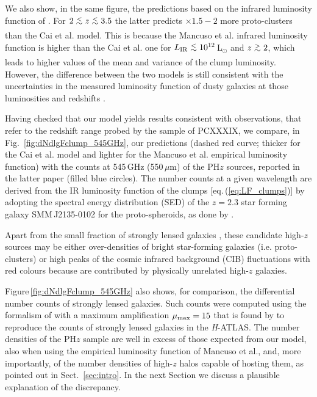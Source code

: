 \documentclass[useAMS,usenatbib]{mn2e}
\def\lsim{\,\lower2truept\hbox{${<\atop\hbox{\raise4truept\hbox{$\sim$}}}$}\,}
\def\gsim{\,\lower2truept\hbox{${> \atop\hbox{\raise4truept\hbox{$\sim$}}}$}\,}
\begin{document}
We also show, in the same figure, the predictions based on the
  infrared luminosity function of
  \cite{Mancuso2016}. For $2\lsim z\lsim3.5$ the latter predicts
  $\times1.5-2$ more proto-clusters than the Cai et
  al. model. This is because the Mancuso et al. infrared luminosity
  function
is higher than the Cai et al. one for $L_{\rm
    IR}\lsim10^{12}\,$L$_{\odot}$ and $z\gsim2$, which leads to
  higher values of the mean and variance of the
  clump luminosity. However, the
  difference between the two models is still consistent with the uncertainties in the
  measured luminosity function of dusty galaxies at those luminosities
  and redshifts \citep[see fig.1 of][]{Mancuso2016}.

Having checked that our model yields results consistent with
observations, that refer to the redshift range probed by the sample of
PCXXXIX, we compare, in Fig.~\ref{fig:dNdlgFclump_545GHz}, our
predictions (dashed red curve; thicker for the Cai et al. model
  and lighter for the Mancuso et al. empirical luminosity function) with the counts at 545\,GHz
(550$\,\mu$m) of the PH$z$ sources, reported in the latter paper
(filled blue circles).  The number counts at a given wavelength are
derived from the IR luminosity function of the clumps
[eq.\,(\ref{eq:LF_clumps})] by adopting the spectral energy
distribution (SED) of the $z=2.3$ star forming galaxy SMM\,J2135-0102
\citep{Swinbank2010} for the proto-spheroids, as done by
\cite{Cai2013}.

Apart from the small fraction of strongly lensed
galaxies \citep[around 3\%;][]{PlanckCollaborationXXVII2015}, these
candidate high-$z$ sources may be either over-densities of bright
star-forming galaxies (i.e. proto-clusters) or high peaks of the
cosmic infrared background (CIB) fluctuations with red colours because
are contributed by physically unrelated high-$z$ galaxies.

Figure\,\ref{fig:dNdlgFclump_545GHz} also shows, for comparison, the differential number
counts of strongly lensed galaxies.
Such counts were computed using the
formalism of \citet[][their SISSA model]{Lapi2012} with a maximum
amplification $\mu_{\rm max}=15$ that is found by \cite{Neg2016}
to reproduce the counts of strongly lensed galaxies in the {\it
  H}-ATLAS. The number densities of the PH$z$ sample are well in excess of those expected from
our model, also when using the empirical luminosity function of
  Mancuso et al., and, more importantly, of the number densities of
high-$z$ halos capable of hosting them,
as pointed out in Sect.~\ref{sec:intro}. In the next Section we discuss a plausible explanation of the discrepancy.
\end{document}
